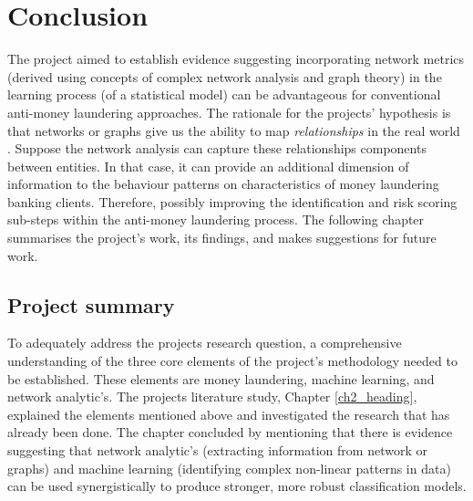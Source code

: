 %
%

\chapter{Conclusion} \label{ch4_heading}

The project aimed to establish evidence suggesting
incorporating network metrics (derived using concepts of complex network analysis and graph theory) in the learning process (of a statistical model) can be advantageous for conventional anti-money laundering approaches. The rationale for the projects' hypothesis is that networks or graphs give us the ability to map \textit{relationships} in the real world \citep{baesens2015fraud}. Suppose the network analysis can capture these relationships components between entities. In that case, it can provide an additional dimension of information to the behaviour patterns on characteristics of money laundering banking clients. Therefore, possibly improving the identification and risk scoring sub-steps within the anti-money laundering process. The following chapter summarises the project's work, its findings, and makes suggestions for future work. 

\section{Project summary}
To adequately address the projects research question, a comprehensive understanding of the three core elements of the project's methodology needed to be established. These elements are money laundering, machine learning, and network analytic's. The projects literature study, Chapter \ref{ch2_heading}, explained the elements mentioned above and investigated the research that has already been done. The chapter concluded by mentioning that there is evidence suggesting that network analytic's (extracting information from network or graphs) and machine learning (identifying complex non-linear patterns in data) can be used synergistically to produce stronger, more robust classification models. 

